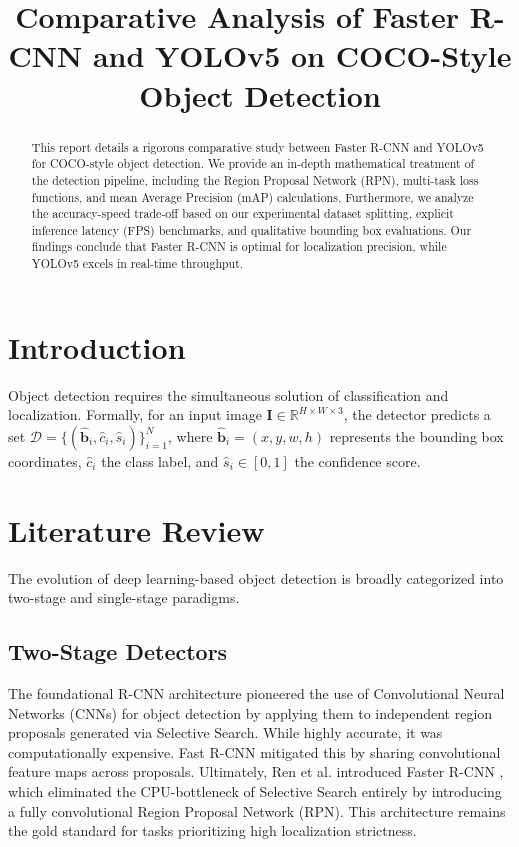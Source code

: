 \documentclass[conference]{IEEEtran}
\begin{document}
\title{Comparative Analysis of Faster R-CNN and YOLOv5 on COCO-Style Object Detection}

\author{
}

\maketitle

\begin{abstract}
This report details a rigorous comparative study between Faster R-CNN and YOLOv5 for COCO-style object detection. We provide an in-depth mathematical treatment of the detection pipeline, including the Region Proposal Network (RPN), multi-task loss functions, and mean Average Precision (mAP) calculations. Furthermore, we analyze the accuracy-speed trade-off based on our experimental dataset splitting, explicit inference latency (FPS) benchmarks, and qualitative bounding box evaluations. Our findings conclude that Faster R-CNN is optimal for localization precision, while YOLOv5 excels in real-time throughput.
\end{abstract}

\section{Introduction}
Object detection requires the simultaneous solution of classification and localization. Formally, for an input image $\mathbf{I} \in \mathbb{R}^{H \times W \times 3}$, the detector predicts a set $\mathcal{D} = \{(\hat{\mathbf{b}}_i, \hat{c}_i, \hat{s}_i)\}_{i=1}^N$, where $\hat{\mathbf{b}}_i = (x, y, w, h)$ represents the bounding box coordinates, $\hat{c}_i$ the class label, and $\hat{s}_i \in [0,1]$ the confidence score.

\section{Literature Review}
The evolution of deep learning-based object detection is broadly categorized into two-stage and single-stage paradigms.

\subsection{Two-Stage Detectors}
The foundational R-CNN architecture \cite{girshick2014rich} pioneered the use of Convolutional Neural Networks (CNNs) for object detection by applying them to independent region proposals generated via Selective Search. While highly accurate, it was computationally expensive. Fast R-CNN mitigated this by sharing convolutional feature maps across proposals. Ultimately, Ren et al. introduced Faster R-CNN \cite{ren2015faster}, which eliminated the CPU-bottleneck of Selective Search entirely by introducing a fully convolutional Region Proposal Network (RPN). This architecture remains the gold standard for tasks prioritizing high localization strictness.
\end{document}
